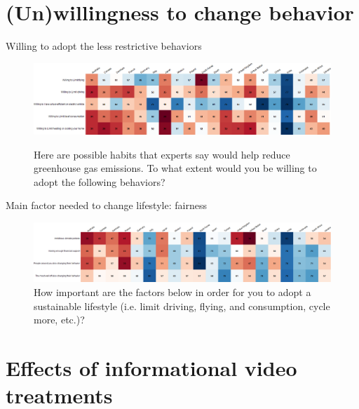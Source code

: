 \section{(Un)willingness to change behavior}
\begin{frame}{Willing to adopt the less restrictive behaviors}%
	\begin{figure}[h!]
	\centering
	\caption{Here are possible habits that experts say would help reduce greenhouse gas emissions.
	To what extent would you be willing to adopt the following behaviors?}
	\includegraphics[width=\textwidth]{../figures/country_comparison/willing_positive_countries.png} \\
	\end{figure}
\end{frame}
	
\begin{frame}{Main factor needed to change lifestyle: fairness}%
	\begin{figure}[h!]
	\centering
	\caption{How important are the factors below in order for you to adopt a sustainable lifestyle (i.e. limit driving, flying, and consumption, cycle more, etc.)?}
	\includegraphics[width=\textwidth]{../figures/country_comparison/condition_positive_countries.png}
	\end{figure}
\end{frame}
	

\section{Effects of informational video treatments}

